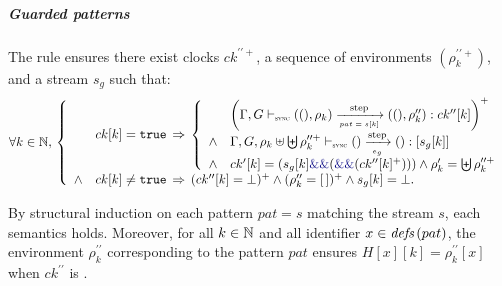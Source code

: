 \begin{skippableproof}
    \subparagraph{Guarded patterns}
    The rule  ensures there exist clocks
    $ck^{\prime\prime+}$, a sequence of environments $(\rho_k^{\prime\prime+})$, and a stream $s_g$
    such that:
    \begin{equation*}
        \forall k \in \N, \,
        \left\{
        \begin{array}{ll}
                   & ck[k] = \true \, \Rightarrow \,
            \left\{
            \begin{array}{ll}
                       & \left(\patOpsem{\rho_k}{pat = s[k]}{ck^{\prime\prime}[k]}{\rho^{\prime\prime}_k}\right)^+                               \\
                \wedge & \exprOpsem{\rho_k \ctxconcat \bigCtxconcat \rho^{\prime\prime+}_k}{()}{e_g}{()}{s_g[k]}                                 \\
                \wedge & ck'[k] = (s_g[k] \kwf{\&\&} (\kwf{\&\&}(ck^{\prime\prime}[k]^+))) \wedge \rho'_k = \bigCtxconcat \rho^{\prime\prime+}_k \\
            \end{array}
            \right.                                     \\
            \wedge & ck[k] \neq \true \, \Rightarrow \,
            (ck^{\prime\prime}[k] = \bot)^+ \wedge (\rho^{\prime\prime}_k = \emptyrho)^+
            \wedge s_g[k] = \bot.                       \\
        \end{array}
        \right.
    \end{equation*}

    By structural induction on each pattern $pat = s$ matching the stream $s$, each semantics
     holds. Moreover, for all $k \in \mathbb{N}$ and all
    identifier $x \in {\ensuremath{\textit{defs}\left(pat\right)}}$, the environment $\rho^{\prime\prime}_k$ corresponding to the
    pattern $pat$ ensures $H[x][k] = \rho^{\prime\prime}_k[x]$ when $ck^{\prime\prime}$ is
    \true.


\end{skippableproof}
